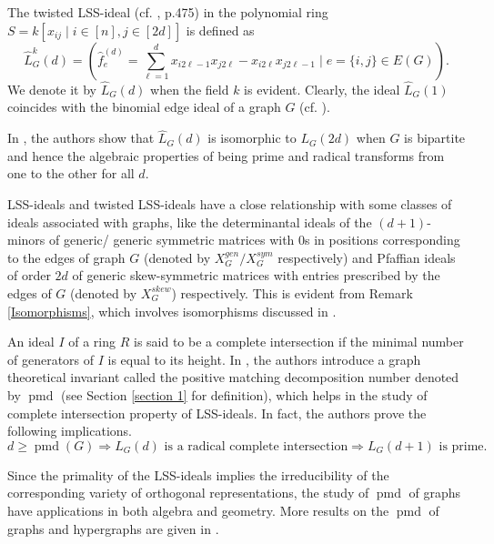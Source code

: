 \documentclass[11pt,a4paper,reqno]{amsart}
\theoremstyle{definition}
\numberwithin{equation}{section}
\DeclareMathOperator{\pmd}{pmd}
\begin{document}
The twisted LSS-ideal (cf. \cite{CW2019}, p.475) in the polynomial ring $S=k[x_{ij} \mid i \in [n], j \in [2d]]$ is defined as 
$$\hat{L}_{G}^k(d)= ( \hat{f}_e^{(d)}= \sum_{\ell=1}^{d}x_{i2\ell -1}x_{j2\ell}-x_{i2\ell }x_{j2\ell-1} \mid e= \{i,j\} \in E(G)).$$
We denote it by $\hat{L}_{G}(d)$ when the field $k$ is evident. Clearly, the ideal $\hat{L}_{G}(1)$ coincides with the binomial edge ideal of a graph $G$ (cf. \cite{HH, O2011}).

In \cite{CW2019}, the authors show that $\hat{L}_G(d)$ is isomorphic to $L_G(2d)$ when $G$ is bipartite and hence the algebraic properties of being prime and radical transforms from one to the other for all $d$.





\vspace{2mm}

LSS-ideals and twisted LSS-ideals have a close relationship with some classes of ideals associated with graphs, like the determinantal ideals of the $(d+1)$-minors of generic/ generic symmetric matrices with $0$s in positions corresponding to the edges of graph $G$ (denoted by $X^{gen}_{G}/X^{sym}_{G}$ respectively) and Pfaffian ideals of order $2d$ of generic skew-symmetric matrices with entries prescribed by the edges of $G$ (denoted by $X^{skew}_{G}$) respectively. This is evident from Remark \ref{Isomorphisms}, which involves isomorphisms discussed in \cite{CW2019}. 

\vspace{2mm}
 
 An ideal $I$ of a ring $R$ is said to be a complete intersection if the minimal number of generators of $I$ is equal to its height. In \cite{CW2019}, the authors introduce a graph theoretical invariant called the positive matching decomposition number denoted by $\pmd$ (see Section \ref{section 1} for definition), which helps in the study of complete intersection property of LSS-ideals. In fact, the authors prove the following implications.
 $$ d \geq \pmd(G) \Rightarrow L_{G}(d) \text{ is a radical complete intersection} \Rightarrow L_G(d+1) \text{ is prime}.$$

Since the primality of the LSS-ideals implies the irreducibility of the corresponding variety of orthogonal representations, the study of $\pmd$ of graphs have applications in both algebra and geometry. More results on the $\pmd$ of graphs and hypergraphs are given in \cite{ANpmd, FG2022, GW2023}. 


\vspace{2mm} 
 
\end{document}
